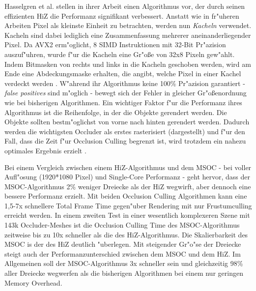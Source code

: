 \documentclass[journal]{vgtc}
\begin{document}
Hasselgren et al. \cite{MSOC} stellen in ihrer Arbeit einen Algorithmus vor, der durch seinen effizienten HiZ die Performanz signifikant verbessert. Anstatt wie in fr"uheren Arbeiten Pixel als kleinste Einheit zu betrachten, werden nun \textit{Kacheln} verwendet. Kacheln sind dabei lediglich eine Zusammenfassung mehrerer aneinanderliegender Pixel. Da AVX2 erm"oglicht, 8 SIMD Instruktionen mit 32-Bit Pr"azision auszuf"uhren, wurde f"ur die Kacheln eine Gr"o\ss{}e von 32x8 Pixeln gew"ahlt. Indem Bitmasken von rechts und links in die Kacheln geschoben werden, wird am Ende eine Abdeckungsmaske erhalten, die angibt, welche Pixel in einer Kachel verdeckt werden \cite{MSOC}.
W"ahrend ihr Algorithmus keine 100\% Pr"azision garantiert - \textit{false positives} sind m"oglich - bewegt sich der Fehler in gleicher Gr"o\ss{}enordnung wie bei bisherigen Algorithmen. Ein wichtiger Faktor f"ur die Performanz ihres Algorithmus ist die Reihenfolge, in der die Objekte gerendert werden. Die Objekte sollten bestm"oglichst von vorne nach hinten gerendert werden. Dadurch werden die wichtigsten Occluder als erstes rasterisiert (dargestellt) und f"ur den Fall, dass die Zeit f"ur Occlusion Culling begrenzt ist, wird trotzdem ein nahezu optimales Ergebnis erzielt \cite{MSOC}.

Bei einem Vergleich zwischen einem HiZ-Algorithmus und dem MSOC - bei voller Aufl"osung (1920*1080 Pixel) und Single-Core Performanz - geht hervor, dass der MSOC-Algorithmus 2\% weniger Dreiecke als der HiZ wegwirft, aber dennoch eine bessere Performanz erzielt. Mit beiden Occlusion Culling Algorithmen kann eine 1,5-7x schnellere Total Frame Time gegen"uber Rendering mit nur Frustumculling erreicht werden. In einem zweiten Test in einer wesentlich komplexeren Szene mit 143k Occluder-Meshes ist die Occlusion Culling Time des MSOC-Algorithmus zeitweise bis zu 10x schneller als die des HiZ-Algorithmus. Die Skalierbarkeit des MSOC is der des HiZ deutlich "uberlegen. Mit steigender Gr"o"se der Dreiecke steigt auch der Performanzunterschied zwischen dem MSOC und dem HiZ. Im Allgemeinen soll der MSOC-Algorithmus 3x schneller sein und gleichzeitig 98\% aller Dreiecke wegwerfen als die bisherigen Algorithmen bei einem nur geringen Memory Overhead.
\end{document}
